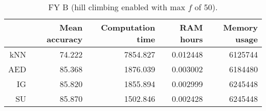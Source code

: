 \begin{table}[h]
\centering
\begin{tabular}{r|rrrr}
    & Mean accuracy & Computation time & RAM hours & Memory usage \\ \hline
kNN & 74.222                   & 7854.827         & 0.012448  & 6125744      \\
AED & 85.368                   & 1876.039         & 0.003002  & 6184480      \\
IG  & 85.820                   & 1855.894         & 0.002999  & 6245448      \\
SU  & 85.870                   & 1502.846         & 0.002428  & 6245448     
\end{tabular}
\caption{FY B (hill climbing enabled with max $f$ of 50).}
\label{Table:FY_B_H}
\end{table}